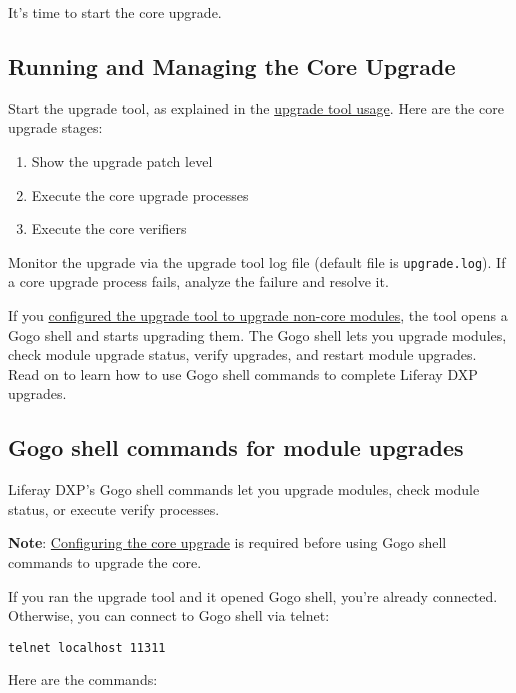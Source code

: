 It's time to start the core upgrade.

\subsection{Running and Managing the Core
Upgrade}\label{running-and-managing-the-core-upgrade}

Start the upgrade tool, as explained in the
\hyperref[upgrade-tool-usage]{upgrade tool usage}. Here are the core
upgrade stages:

\begin{enumerate}
\def\labelenumi{\arabic{enumi}.}
\item
  Show the upgrade patch level
\item
  Execute the core upgrade processes
\item
  Execute the core verifiers
\end{enumerate}

Monitor the upgrade via the upgrade tool log file (default file is
\texttt{upgrade.log}). If a core upgrade process fails, analyze the
failure and resolve it.

If you \hyperref[configuring-non-core-module-upgrades]{configured the
upgrade tool to upgrade non-core modules}, the tool opens a Gogo shell
and starts upgrading them. The Gogo shell lets you upgrade modules,
check module upgrade status, verify upgrades, and restart module
upgrades. Read on to learn how to use Gogo shell commands to complete
Liferay DXP upgrades.

\subsection{Gogo shell commands for module
upgrades}\label{gogo-shell-commands-for-module-upgrades}

Liferay DXP's Gogo shell commands let you upgrade modules, check module
status, or execute verify processes.

\noindent\hrulefill

\textbf{Note}: \hyperref[configuring-the-core-upgrade]{Configuring the
core upgrade} is required before using Gogo shell commands to upgrade
the core.

\noindent\hrulefill

If you ran the upgrade tool and it opened Gogo shell, you're already
connected. Otherwise, you can connect to Gogo shell via telnet:

\texttt{telnet\ localhost\ 11311}

Here are the commands:

